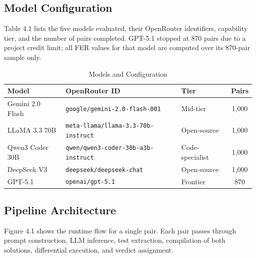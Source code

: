 \subsection{Model Configuration}

Table 4.1 lists the five models evaluated, their OpenRouter identifiers, capability tier, and the number of pairs completed. GPT-5.1 stopped at 870 pairs due to a project credit limit; all FER values for that model are computed over its 870-pair sample only.

\begin{table}[h!]
    \centering
    \caption{Models and Configuration}
    \label{tab:models}
    \begin{tabular}{lllc}
        \toprule
        \textbf{Model} & \textbf{OpenRouter ID} & \textbf{Tier} & \textbf{Pairs} \\
        \midrule
        Gemini 2.0 Flash   & \texttt{google/gemini-2.0-flash-001}           & Mid-tier        & 1,000 \\
        LLaMA 3.3 70B      & \texttt{meta-llama/llama-3.3-70b-instruct}     & Open-source     & 1,000 \\
        Qwen3 Coder 30B    & \texttt{qwen/qwen3-coder-30b-a3b-instruct}     & Code-specialist & 1,000 \\
        DeepSeek V3        & \texttt{deepseek/deepseek-chat}                & Open-source     & 1,000 \\
        GPT-5.1            & \texttt{openai/gpt-5.1}                        & Frontier        &   870 \\
        \bottomrule
    \end{tabular}
\end{table}

\subsection{Pipeline Architecture}

Figure 4.1 shows the runtime flow for a single pair. Each pair passes through prompt construction, LLM inference, test extraction, compilation of both solutions, differential execution, and verdict assignment.

